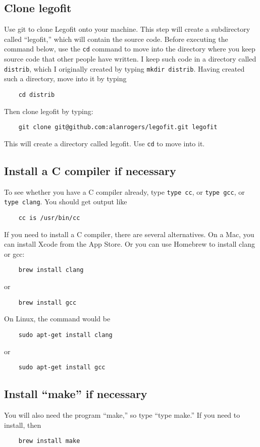 \documentclass[11pt]{article}
\begin{document}
\subsection{Clone legofit}
Use git to clone Legofit onto your machine. This step will create a
subdirectory called ``legofit,'' which will contain the source
code. Before executing the command below, use the \texttt{cd} command
to move into the directory where you keep source code that other
people have written. I keep such code in a directory called
\texttt{distrib}, which I originally created by typing \texttt{mkdir
  distrib}. Having created such a directory, move into it by typing
\begin{verbatim}
    cd distrib
\end{verbatim}
Then clone legofit by typing:
\begin{verbatim}
    git clone git@github.com:alanrogers/legofit.git legofit
\end{verbatim}
This will create a directory called legofit. Use \texttt{cd} to move into it.

\subsection{Install a C compiler if necessary}
To see whether you have a C compiler already, type \texttt{type cc},
or \texttt{type gcc}, or \texttt{type clang}. You should get output like
\begin{verbatim}
    cc is /usr/bin/cc
\end{verbatim}
If you need to install a C compiler, there are several
alternatives. On a Mac, you can install Xcode from the App Store. Or
you can use Homebrew to install clang or gcc:
\begin{verbatim}
    brew install clang
\end{verbatim}
or
\begin{verbatim}
    brew install gcc
\end{verbatim}
On Linux, the command would be
\begin{verbatim}
    sudo apt-get install clang
\end{verbatim}
or
\begin{verbatim}
    sudo apt-get install gcc
\end{verbatim}

\subsection{Install ``make'' if necessary}
You will also need the program ``make,'' so type ``type make.'' If you
need to install, then
\begin{verbatim}
    brew install make
\end{verbatim}
\end{document}
